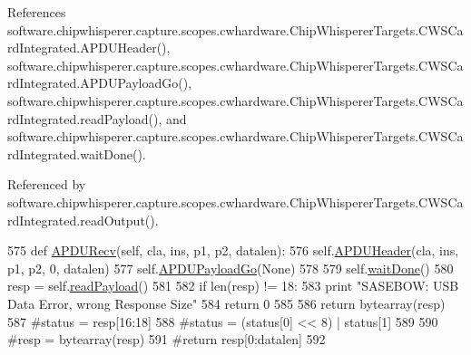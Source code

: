 References software.\+chipwhisperer.\+capture.\+scopes.\+cwhardware.\+Chip\+Whisperer\+Targets.\+C\+W\+S\+Card\+Integrated.\+A\+P\+D\+U\+Header(), software.\+chipwhisperer.\+capture.\+scopes.\+cwhardware.\+Chip\+Whisperer\+Targets.\+C\+W\+S\+Card\+Integrated.\+A\+P\+D\+U\+Payload\+Go(), software.\+chipwhisperer.\+capture.\+scopes.\+cwhardware.\+Chip\+Whisperer\+Targets.\+C\+W\+S\+Card\+Integrated.\+read\+Payload(), and software.\+chipwhisperer.\+capture.\+scopes.\+cwhardware.\+Chip\+Whisperer\+Targets.\+C\+W\+S\+Card\+Integrated.\+wait\+Done().



Referenced by software.\+chipwhisperer.\+capture.\+scopes.\+cwhardware.\+Chip\+Whisperer\+Targets.\+C\+W\+S\+Card\+Integrated.\+read\+Output().


\begin{DoxyCode}
575     \textcolor{keyword}{def }\hyperlink{classsoftware_1_1chipwhisperer_1_1capture_1_1scopes_1_1cwhardware_1_1ChipWhispererTargets_1_1CWSCardIntegrated_a9843497b169227000cf478d1bbcc030e}{APDURecv}(self, cla, ins, p1, p2, datalen):
576         self.\hyperlink{classsoftware_1_1chipwhisperer_1_1capture_1_1scopes_1_1cwhardware_1_1ChipWhispererTargets_1_1CWSCardIntegrated_aa8ea0b03efd00e48ad594c84efa31cb3}{APDUHeader}(cla, ins, p1, p2, 0, datalen)
577         self.\hyperlink{classsoftware_1_1chipwhisperer_1_1capture_1_1scopes_1_1cwhardware_1_1ChipWhispererTargets_1_1CWSCardIntegrated_affc817c48f2b38d8fc0c2a98a5398b1e}{APDUPayloadGo}(\textcolor{keywordtype}{None})
578 
579         self.\hyperlink{classsoftware_1_1chipwhisperer_1_1capture_1_1scopes_1_1cwhardware_1_1ChipWhispererTargets_1_1CWSCardIntegrated_a2343e6229395b9e45ea9cd73e4444000}{waitDone}()
580         resp = self.\hyperlink{classsoftware_1_1chipwhisperer_1_1capture_1_1scopes_1_1cwhardware_1_1ChipWhispererTargets_1_1CWSCardIntegrated_a67184e8f2821874c994dbb365c0a3fc0}{readPayload}()
581 
582         \textcolor{keywordflow}{if} len(resp) != 18:
583             \textcolor{keywordflow}{print} \textcolor{stringliteral}{"SASEBOW: USB Data Error, wrong Response Size"}
584             \textcolor{keywordflow}{return} 0
585 
586         \textcolor{keywordflow}{return} bytearray(resp)
587         \textcolor{comment}{#status = resp[16:18]}
588         \textcolor{comment}{#status = (status[0] << 8) | status[1]}
589 
590         \textcolor{comment}{#resp = bytearray(resp)}
591         \textcolor{comment}{#return resp[0:datalen]       }
592       
\end{DoxyCode}
\hypertarget{classsoftware_1_1chipwhisperer_1_1capture_1_1scopes_1_1cwhardware_1_1ChipWhispererTargets_1_1CWSCardIntegrated_aca4b5ed705dc9e44eedb655b28e392b3}{}
